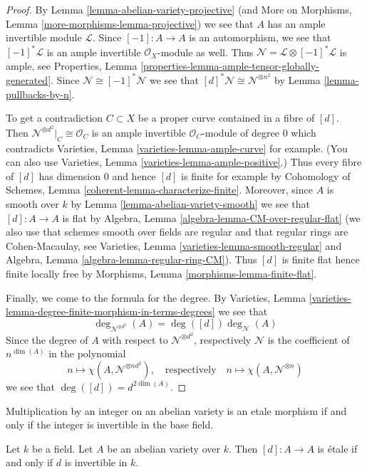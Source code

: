 \begin{proof}
By Lemma \ref{lemma-abelian-variety-projective}
(and More on Morphisms, Lemma \ref{more-morphisms-lemma-projective})
we see that $A$ has an ample invertible module $\mathcal{L}$.
Since $[-1] : A \to A$ is an automorphism, we see that
$[-1]^*\mathcal{L}$ is an ample invertible $\mathcal{O}_X$-module
as well. Thus $\mathcal{N} = \mathcal{L} \otimes [-1]^*\mathcal{L}$
is ample, see
Properties, Lemma \ref{properties-lemma-ample-tensor-globally-generated}.
Since $\mathcal{N} \cong [-1]^*\mathcal{N}$ we see that
$[d]^*\mathcal{N} \cong \mathcal{N}^{\otimes n^2}$ by
Lemma \ref{lemma-pullbacks-by-n}.

\medskip\noindent
To get a contradiction $C \subset X$ be a proper curve contained in a
fibre of $[d]$. Then $\mathcal{N}^{\otimes d^2}|_C \cong \mathcal{O}_C$
is an ample invertible $\mathcal{O}_C$-module of degree $0$ which
contradicts Varieties, Lemma \ref{varieties-lemma-ample-curve} for example.
(You can also use Varieties, Lemma \ref{varieties-lemma-ample-positive}.)
Thus every fibre of $[d]$ has dimension $0$ and hence $[d]$ is finite
for example by Cohomology of Schemes, Lemma
\ref{coherent-lemma-characterize-finite}.
Moreover, since $A$ is smooth over $k$ by
Lemma \ref{lemma-abelian-variety-smooth}
we see that $[d] : A \to A$ is flat by
Algebra, Lemma \ref{algebra-lemma-CM-over-regular-flat}
(we also use that schemes smooth over fields are regular and that
regular rings are Cohen-Macaulay, see
Varieties, Lemma \ref{varieties-lemma-smooth-regular} and
Algebra, Lemma \ref{algebra-lemma-regular-ring-CM}).
Thus $[d]$ is finite flat hence finite locally free by
Morphisms, Lemma \ref{morphisms-lemma-finite-flat}.

\medskip\noindent
Finally, we come to the formula for the degree. By
Varieties, Lemma \ref{varieties-lemma-degree-finite-morphism-in-terms-degrees}
we see that
$$
\deg_{\mathcal{N}^{\otimes d^2}}(A) = \deg([d]) \deg_\mathcal{N}(A)
$$
Since the degree of $A$ with respect to
$\mathcal{N}^{\otimes d^2}$, respectively $\mathcal{N}$
is the coefficient of $n^{\dim(A)}$ in the polynomial
$$
n \longmapsto \chi(A, \mathcal{N}^{\otimes nd^2}),\quad
\text{respectively}\quad n \longmapsto \chi(A, \mathcal{N}^{\otimes n})
$$
we see that $\deg([d]) = d^{2 \dim(A)}$.
\end{proof}

\begin{lemma}
\label{lemma-abelian-variety-multiplication-by-d-etale}
\begin{slogan}
Multiplication by an integer on an abelian variety is an etale morphism
if and only if the integer is invertible in the base field.
\end{slogan}
Let $k$ be a field. Let $A$ be an abelian variety over $k$.
Then $[d] : A \to A$ is \'etale if and only if $d$ is invertible in $k$.
\end{lemma}

